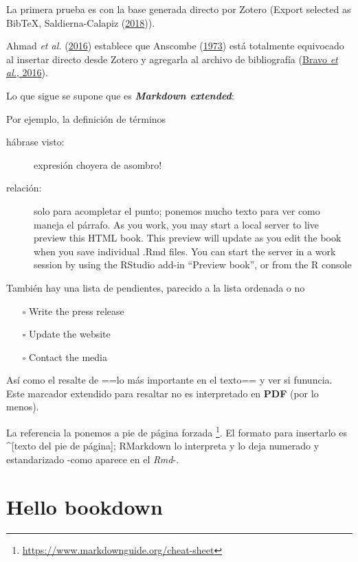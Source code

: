 \documentclass[
  12pt,
]{book}
\providecommand{\tightlist}{%
  \setlength{\itemsep}{0pt}\setlength{\parskip}{0pt}}
\theoremstyle{definition}
\theoremstyle{definition}
\theoremstyle{definition}
\theoremstyle{definition}
\theoremstyle{remark}
\begin{document}
La primera prueba es con la base generada directo por Zotero (Export selected as BibTeX, Saldierna-Calapiz (\protect\hyperlink{ref-saldierna-calapiz2018Efectored}{2018})).

Ahmad \emph{et al.} (\protect\hyperlink{ref-ahmad2016UsingFisher}{2016}) establece que Anscombe (\protect\hyperlink{ref-anscombe1973GraphsStatistical}{1973}) está totalmente equivocado al insertar directo desde Zotero y agregarla al archivo de bibliografía (\protect\hyperlink{ref-bravo2016Teachinghigher}{Bravo \emph{et al.}, 2016}).

Lo que sigue se supone que es \textbf{\emph{Markdown extended}}:

Por ejemplo, la definición de términos

\begin{description}
\item[hábrase visto:]
expresión choyera de asombro!
\item[relación:]
solo para acompletar el punto; ponemos mucho texto para ver como maneja el párrafo. As you work, you may start a local server to live preview this HTML book. This preview will update as you edit the book when you save individual .Rmd files. You can start the server in a work session by using the RStudio add-in ``Preview book'', or from the R console
\end{description}

También hay una lista de pendientes, parecido a la lista ordenada o no

\begin{itemize}
\tightlist
\item[$\square$]
  Write the press release
\item[$\square$]
  Update the website
\item[$\square$]
  Contact the media
\end{itemize}

Así como el resalte de ==lo más importante en el texto== y ver si fununcia. Este marcador extendido para resaltar no es interpretado en \textbf{PDF} (por lo menos).

La referencia la ponemos a pie de página forzada \footnote{\url{https://www.markdownguide.org/cheat-sheet}}. El formato para insertarlo es \^{}{[}texto del pie de página{]}; RMarkdown lo interpreta y lo deja numerado y estandarizado -como aparece en el \emph{Rmd}-.

\hypertarget{hello-bookdown}{%
\chapter{Hello bookdown}\label{hello-bookdown}}
\end{document}
